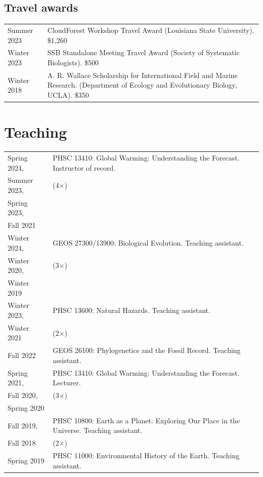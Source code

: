\documentclass[10pt]{article}
\begin{document}
\subsection*{Travel awards}

\begin{tabularx}{\textwidth}{>{\raggedleft\arraybackslash}p{2.2cm} X}
Summer 2023 & CloudForest Workshop Travel Award (Louisiana State University). \$1,260 \\[0.1cm]
Winter 2023 & SSB Standalone Meeting Travel Award (Society of Systematic Biologists). \$500 \\[0.1cm]
Winter 2018 & A. R. Wallace Scholarship for International Field and Marine Research. (Department of Ecology and Evolutionary Biology, UCLA). \$350
\end{tabularx}

\section*{Teaching}

\begin{tabularx}{\textwidth}{>{\raggedleft\arraybackslash}p{2.2cm} X}
Spring 2024, & PHSC 13410: Global Warming: Understanding the Forecast. Instructor of record. \\
Summer 2023, & (4$\times$) \\
Spring 2023, & \\
Fall 2021\phantom{,} & \\[0.15cm]
Winter 2024, & GEOS 27300/13900: Biological Evolution. Teaching assistant. \\
Winter 2020, & (3$\times$) \\
Winter 2019\phantom{,} & \\[0.15cm]
Winter 2023, & PHSC 13600: Natural Hazards. Teaching assistant. \\
Winter 2021\phantom{,} & (2$\times$) \\[0.15cm]
Fall 2022 & GEOS 26100: Phylogenetics and the Fossil Record. Teaching assistant. \\[0.15cm]
Spring 2021, & PHSC 13410: Global Warming: Understanding the Forecast. Lecturer. \\
Fall 2020, & (3$\times$) \\
Spring 2020\phantom{,} & \\[0.15cm]
Fall 2019, & PHSC 10800: Earth as a Planet: Exploring Our Place in the Universe. Teaching assistant. \\
Fall 2018\phantom{,} & (2$\times$) \\[0.15cm]
Spring 2019 & PHSC 11000: Environmental History of the Earth. Teaching assistant.
\end{tabularx}
\end{document}
